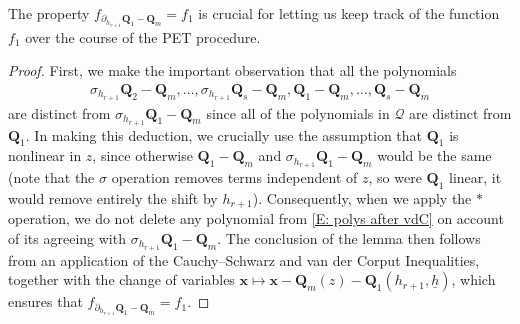 \documentclass[11pt]{amsart}
\theoremstyle{definition}
\newcommand{\C}{{\mathbb C}}
\newcommand{\Z}{{\mathbb Z}}
\newcommand{\CQ}{{\mathcal Q}}
\newcommand{\bq}{{\textbf{Q}}}
\newcommand{\q}{{\textbf{Q}}}
\newcommand{\bx}{{\textbf{x}}}
\newcommand{\uh}{{\underline{h}}}
\begin{document}
    The property $f_{\partial_{h_{r+1}}\q_1 - \q_m} = f_1$ is crucial for letting us keep track of the function $f_1$ over the course of the PET procedure.
    \begin{proof}
        First, we make the important observation that all the polynomials
        \begin{align}\label{E: polys after vdC}
            \sigma_{h_{r+1}}{\q}_2-{\q}_m, \ldots, \sigma_{h_{r+1}}{\q}_s - {\q}_m, {\q}_1-{\q}_m, \ldots,  {\q}_s-{\q}_m
        \end{align}
        are distinct from $\sigma_{h_{r+1}}{\q}_1-{\q}_m$ since all of the polynomials in $\CQ$ are distinct from $\bq_1$. In making this deduction, we crucially use the assumption that $\q_1$ is nonlinear in $z$, since otherwise ${\q}_1-{\q}_m$ and $\sigma_{h_{r+1}}{\q}_1-{\q}_m$ would be the same (note that the $\sigma$ operation removes terms independent of $z$, so were ${\q}_1$ linear, it would remove entirely the shift by $h_{r+1}$).  Consequently, when we apply the $*$ operation, we do not delete any polynomial from \eqref{E: polys after vdC} on account of its agreeing with $\sigma_{h_{r+1}}{\q}_1-{\q}_m$. The conclusion of the lemma then follows from an application of the Cauchy--Schwarz and van der Corput Inequalities, together with the change of variables $\bx\mapsto \bx -{\bq}_m(z)-\bq_1(h_{r+1}, \uh)$,  
        which ensures that $f_{\partial_{h_{r+1}}{\q}_1 - {\q}_m} = f_1$.
    \end{proof}
\end{document}
